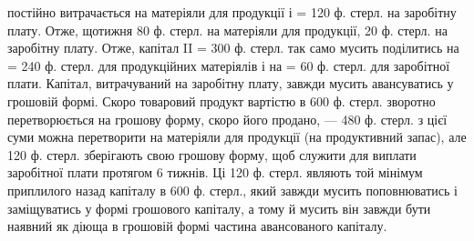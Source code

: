 \parcont{}  %
постійно витрачається на матеріяли для продукції і  = 120 ф. стерл.
на заробітну плату. Отже, щотижня 80 ф. стерл. на матеріяли для продукції,
20 ф. стерл. на заробітну плату. Отже, капітал II = 300 ф. стерл.
так само мусить поділитись на  = 240 ф. стерл. для продукційних матеріялів
і на  = 60 ф. стерл. для заробітної плати. Капітал, витрачуваний
на заробітну плату, завжди мусить авансуватись у грошовій формі.
Скоро товаровий продукт вартістю в 600 ф. стерл. зворотно перетворюється
на грошову форму, скоро його продано, — 480 ф. стерл. з цієї
суми можна перетворити на матеріяли для продукції (на продуктивний
запас), але 120 ф. стерл. зберігають свою грошову форму, щоб служити
для виплати заробітної плати протягом 6 тижнів. Ці 120 ф. стерл. являють
той мінімум приплилого назад капіталу в 600 ф. стерл., який завжди
мусить поповнюватись і заміщуватись у формі грошового капіталу, а
тому й мусить він завжди бути наявний як діюща в грошовій формі частина
авансованого капіталу.

